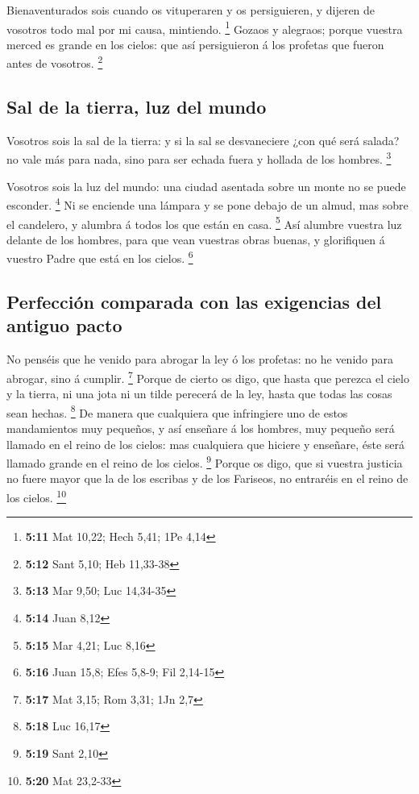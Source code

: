  Bienaventurados sois cuando os vituperaren y os
persiguieren, y dijeren de vosotros todo mal por mi causa, mintiendo.
\footnote{\textbf{5:11} Mat 10,22; Hech 5,41; 1Pe 4,14} 
Gozaos y alegraos; porque vuestra merced es grande en los cielos: que
así persiguieron á los profetas que fueron antes de vosotros.
\footnote{\textbf{5:12} Sant 5,10; Heb 11,33-38}

\hypertarget{sal-de-la-tierra-luz-del-mundo}{%
\subsection{Sal de la tierra, luz del
mundo}\label{sal-de-la-tierra-luz-del-mundo}}

 Vosotros sois la sal de la tierra: y si la sal se
desvaneciere ¿con qué será salada? no vale más para nada, sino para ser
echada fuera y hollada de los hombres. \footnote{\textbf{5:13} Mar 9,50;
  Luc 14,34-35}

 Vosotros sois la luz del mundo: una ciudad asentada
sobre un monte no se puede esconder. \footnote{\textbf{5:14} Juan 8,12}
 Ni se enciende una lámpara y se pone debajo de un almud,
mas sobre el candelero, y alumbra á todos los que están en casa.
\footnote{\textbf{5:15} Mar 4,21; Luc 8,16}  Así alumbre
vuestra luz delante de los hombres, para que vean vuestras obras buenas,
y glorifiquen á vuestro Padre que está en los cielos. \footnote{\textbf{5:16}
  Juan 15,8; Efes 5,8-9; Fil 2,14-15}

\hypertarget{perfecciuxf3n-comparada-con-las-exigencias-del-antiguo-pacto}{%
\subsection{Perfección comparada con las exigencias del antiguo
pacto}\label{perfecciuxf3n-comparada-con-las-exigencias-del-antiguo-pacto}}

 No penséis que he venido para abrogar la ley ó los
profetas: no he venido para abrogar, sino á cumplir. \footnote{\textbf{5:17}
  Mat 3,15; Rom 3,31; 1Jn 2,7}  Porque de cierto os digo,
que hasta que perezca el cielo y la tierra, ni una jota ni un tilde
perecerá de la ley, hasta que todas las cosas sean hechas. \footnote{\textbf{5:18}
  Luc 16,17}  De manera que cualquiera que infringiere
uno de estos mandamientos muy pequeños, y así enseñare á los hombres,
muy pequeño será llamado en el reino de los cielos: mas cualquiera que
hiciere y enseñare, éste será llamado grande en el reino de los cielos.
\footnote{\textbf{5:19} Sant 2,10}  Porque os digo, que
si vuestra justicia no fuere mayor que la de los escribas y de los
Fariseos, no entraréis en el reino de los cielos. \footnote{\textbf{5:20}
  Mat 23,2-33}


